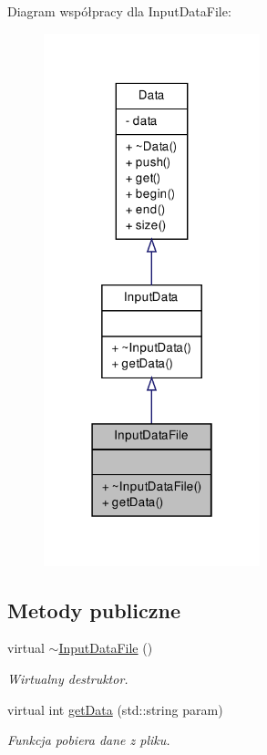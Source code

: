 \-Diagram współpracy dla \-Input\-Data\-File\-:\nopagebreak
\begin{figure}[H]
\begin{center}
\leavevmode
\includegraphics[width=178pt]{class_input_data_file__coll__graph}
\end{center}
\end{figure}
\subsection*{\-Metody publiczne}
\begin{DoxyCompactItemize}
\item 
virtual \hyperlink{class_input_data_file_a6168fb68ae3087693ed32fead92db248}{$\sim$\-Input\-Data\-File} ()
\begin{DoxyCompactList}\small\item\em \-Wirtualny destruktor. \end{DoxyCompactList}\item 
virtual int \hyperlink{class_input_data_file_acdd212448e3fcd8bc6653e0c9a2fadfb}{get\-Data} (std\-::string param)
\begin{DoxyCompactList}\small\item\em \-Funkcja pobiera dane z pliku. \end{DoxyCompactList}\end{DoxyCompactItemize}



